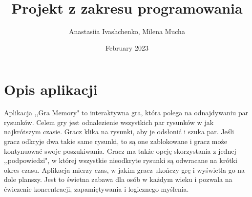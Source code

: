\documentclass[a4paper]{article}
\title{Projekt z zakresu programowania}
\author{Anastasiia Ivashchenko, Milena Mucha}
\date{February 2023}
\begin{document}
\maketitle
\newpage
\tableofcontents
\section{Opis aplikacji}
Aplikacja ,,Gra Memory" to interaktywna gra, która polega na odnajdywaniu par rysunków. Celem gry jest odnalezienie wszystkich par rysunków w jak najkrótszym czasie. Gracz klika na rysunki, aby je odsłonić i szuka par. Jeśli gracz odkryje dwa takie same rysunki, to są one zablokowane i gracz może kontynuować swoje poszukiwania. Gracz ma także opcję skorzystania z jednej ,,podpowiedzi", w której wszystkie nieodkryte rysunki są odwracane na krótki okres czasu. Aplikacja mierzy czas, w jakim gracz ukończy grę i wyświetla go na dole planszy. Jest to świetna zabawa dla osób w każdym wieku i pozwala na ćwiczenie koncentracji, zapamiętywania i logicznego myślenia.
\end{document}
